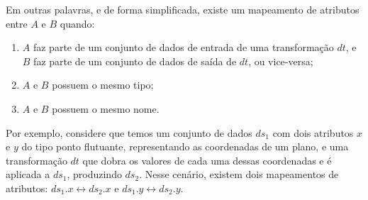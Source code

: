 
Em outras palavras, e de forma simplificada, existe um mapeamento de atributos entre \( A \) e \( B \) quando:

\begin{enumerate}
    \item \( A \) faz parte de um conjunto de dados de entrada de uma transformação \( dt \), e \( B \) faz parte de um conjunto de dados de saída de \( dt \), ou vice-versa;
    \item \( A \) e \( B \) possuem o mesmo tipo;
    \item \( A \) e \( B \) possuem o mesmo nome.
\end{enumerate}

Por exemplo, considere que temos um conjunto de dados \( ds_{1} \) com dois atributos \( x \) e \( y \) do tipo ponto flutuante, representando as coordenadas de um plano, e uma transformação \( dt \) que dobra os valores de cada uma dessas coordenadas e é aplicada a \( ds_{1} \), produzindo \( ds_{2} \). Nesse cenário, existem dois mapeamentos de atributos: \( ds_{1}.x \leftrightarrow ds_{2}.x \) e \( ds_{1}.y \leftrightarrow ds_{2}.y \).

